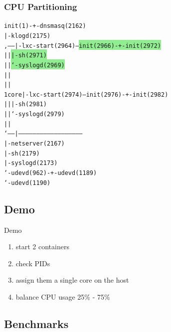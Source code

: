 \begin{frame}[fragile]
\frametitle{CPU Partitioning}
\begin{alltt}\footnotesize
init(1)-+-dnsmasq(2162)
        |-klogd(2175)       
  ,-----|-lxc-start(2964)---\colorbox{LightGreen}{init(2966)-+-init(2972)    }
  |     |                \colorbox{LightGreen}{              |-sh(2971)      }
  |     |                   \colorbox{LightGreen}{              `-syslogd(2969) }
  |     |                   
  |     |                   
1 core  |-lxc-start(2974)---\colorbox{LightRed}{init(2976)-+-init(2982)    }
  |     |                \colorbox{LightRed}{              |-sh(2981)      }
  |     |                   \colorbox{LightRed}{              `-syslogd(2979) }
  |     |                   
  `-----|-----------------------------------------------------
        |-netserver(2167)
        |-sh(2179)
        |-syslogd(2173)
        `-udevd(962)-+-udevd(1189)
                     `-udevd(1190)
\end{alltt}\normalsize
\end{frame}

\subsection{Demo}

\begin{frame}{Demo}
\begin{enumerate}
\item start 2 containers
\item check PIDs
\item assign them a single core on the host
\item balance CPU usage 25\% - 75\%
\end{enumerate}
\end{frame}

\subsection{Benchmarks}

